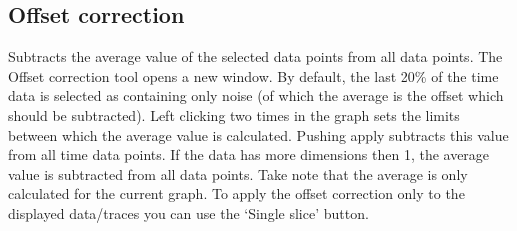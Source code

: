 \documentclass[11pt,a4paper]{article}
\begin{document}
\subsection{Offset correction}
Subtracts the average value of the selected data points from all data points.
The Offset correction tool opens a new window.
By default, the last 20\% of the time data is selected as containing only noise (of which the average is the offset which should be subtracted).
Left clicking two times in the graph sets the limits between which the average value is calculated.
Pushing apply subtracts this value from all time data points.
If the data has more dimensions then 1, the average value is subtracted from all data points.
Take note that the average is only calculated for the current graph.
To apply the offset correction only to the displayed data/traces you can use the `Single slice' button.


\end{document}
